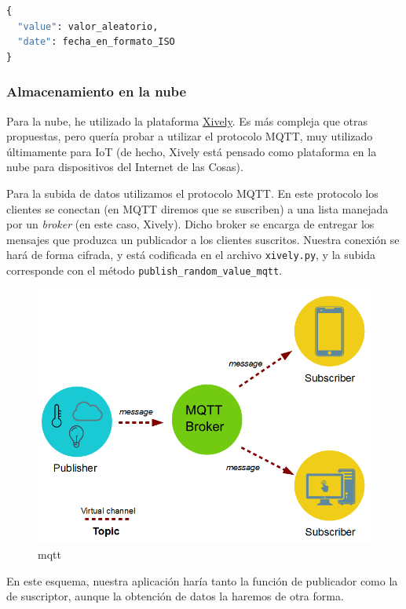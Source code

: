 \documentclass{article}
\begin{document}
\begin{lstlisting}[language=python]
{
  "value": valor_aleatorio,
  "date": fecha_en_formato_ISO
}

\end{lstlisting}


\subsubsection{Almacenamiento en la nube}

Para la nube, he utilizado la plataforma \href{https://www.xively.com/}{Xively}. Es más compleja que otras propuestas, pero quería probar a utilizar el protocolo MQTT, muy utilizado últimamente para IoT (de hecho, Xively está pensado como plataforma en la nube para dispositivos del Internet de las Cosas).

Para la subida de datos utilizamos el protocolo MQTT. En este protocolo los clientes se conectan (en MQTT diremos que se suscriben) a una lista manejada por un \emph{broker} (en este caso, Xively). Dicho broker se encarga de entregar los mensajes que produzca un publicador a los clientes suscritos. Nuestra conexión se hará de forma cifrada, y está codificada en el archivo \texttt{xively.py}, y la subida corresponde con el método \texttt{publish\_random\_value\_mqtt}.

\begin{figure}
\centering
\includegraphics[width=\textwidth]{mqtt_publisher_subscriber-1.png}
\caption{mqtt}
\end{figure}

En este esquema, nuestra aplicación haría tanto la función de publicador como la de suscriptor, aunque la obtención de datos la haremos de otra forma.
\end{document}
